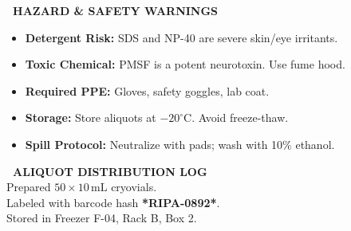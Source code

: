 \documentclass[10pt,a4paper]{article}
\begin{document}
\begin{tcolorbox}[labcardnavy, title={\small\bfseries\color{white}\faFlask\ SECTION 3: SPECIALIZED FORMULATION SHEET -- BATCH \# REAG-2026-0892 (RIPA LYSIS BUFFER)}, coltitle=white, colbacktitle=labnavy]
\begin{minipage}[t]{0.35\textwidth}
\begin{tcolorbox}[labcard, colback=labred!5!white, colframe=labred]
      {\small\bfseries\color{labred}\faExclamationTriangle\ HAZARD \& SAFETY WARNINGS}\\[2pt]
      {\tiny\color{labtext}
      \begin{itemize}[leftmargin=8pt, itemsep=1pt]
        \item \textbf{Detergent Risk:} SDS and NP-40 are severe skin/eye irritants.
        \item \textbf{Toxic Chemical:} PMSF is a potent neurotoxin. Use fume hood.
        \item \textbf{Required PPE:} Gloves, safety goggles, lab coat.
        \item \textbf{Storage:} Store aliquots at $-20^\circ\text{C}$. Avoid freeze-thaw.
        \item \textbf{Spill Protocol:} Neutralize with pads; wash with 10\% ethanol.
      \end{itemize}
      }
    \end{tcolorbox}
    \vspace{-4pt}
    \begin{tcolorbox}[labcard, colback=labteal!5!white, colframe=labteal]
      {\small\bfseries\color{labteal}\faLock\ ALIQUOT DISTRIBUTION LOG}\\[1pt]
      {\tiny\color{labtext}
      Prepared $50 \times 10\,\text{mL}$ cryovials.\\
      Labeled with barcode hash \textbf{*RIPA-0892*}.\\
      Stored in Freezer F-04, Rack B, Box 2.
      }
    \end{tcolorbox}
  \end{minipage}

\end{tcolorbox}

\vspace{3pt}
\end{document}
